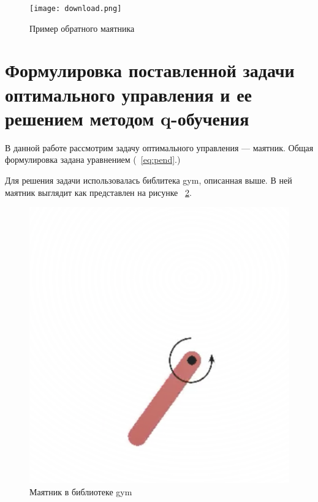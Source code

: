 \begin{figure}[h]
	\centering
	\texttt{[image: download.png]}
	\caption {Пример обратного маятника}
	\label{fig:cart-pole}
\end{figure}

\section{Формулировка поставленной задачи оптимального управления и ее решением методом q-обучения}\label{1sec:optimal-control}

В данной работе рассмотрим задачу оптимального управления — маятник. Общая формулировка задана уравнением (~\ref{eq:pend}.) 

Для решения задачи использовалась библитека gym, описанная выше. В ней маятник выглядит как представлен на рисунке ~\ref{fig:pend}. 

\begin{figure}[h]
	\centering
	\includegraphics[scale=0.2]{pend.png}
	\caption {Маятник в библиотеке gym}
	\label{fig:pend}
\end{figure}


